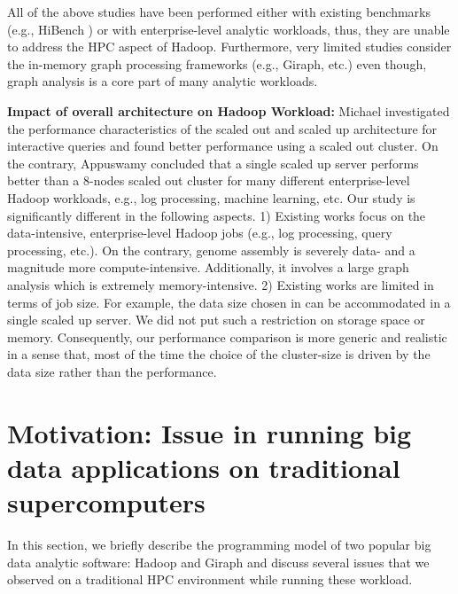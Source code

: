 \documentclass[10pt, conference, compsocconf]{IEEEtran}
\begin{document}
All of the above studies have been performed either with existing benchmarks (e.g., HiBench \cite{bm:hibench}) or with enterprise-level analytic workloads, thus, they are unable to address the HPC aspect of Hadoop. Furthermore, very limited studies consider the in-memory graph processing frameworks (e.g., Giraph, etc.) even though, graph analysis is a core part of many analytic workloads.

\textbf{Impact of overall architecture on Hadoop Workload:} 
Michael \cite{scaleupscaleout:michael} investigated the performance characteristics of the scaled out and scaled up architecture for interactive queries and found better performance using a scaled out cluster. On the contrary, Appuswamy \cite{scaleupscaleout:appuswamy} concluded that a single scaled up server performs better than a 8-nodes scaled out cluster for many different enterprise-level Hadoop workloads, e.g., log processing, machine learning, etc. Our study is significantly different in the following aspects. 
1) Existing works focus on the data-intensive, enterprise-level Hadoop jobs (e.g., log processing, query processing, etc.). On the contrary, genome assembly is severely data- and a magnitude more compute-intensive. Additionally, it involves a large graph analysis which is extremely memory-intensive. 
2) Existing works are limited in terms of job size. For example, the data size chosen in \cite{scaleupscaleout:appuswamy} can be accommodated in a single scaled up server. We did not put such a restriction on storage space or memory. Consequently, our performance comparison is more generic and realistic in a sense that, most of the time the choice of the cluster-size is driven by the data size rather than the performance. 

\section {Motivation: Issue in running big data applications on traditional supercomputers} \label{Bigdata Softwares on Traditional Supercomputers}
In this section, we briefly describe the programming model of two popular big data analytic software: Hadoop and Giraph and discuss several issues that we observed on a traditional HPC environment while running these workload.
\end{document}
